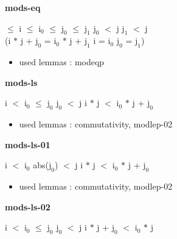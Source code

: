 \documentclass[a4paper]{article}
\begin{document}
\medskip

\bigskip

{\large\bf mods-eq}

\medskip

\Fol {} $\le$ i  $\le$ $\mbox{i}_{0}$  $\le$ $\mbox{j}_{0}$  $\le$ $\mbox{j}_{1}$ \And $\mbox{j}_{0}$ $<$ j \And $\mbox{j}_{1}$ $<$ j \\
 \tabf \Imp (i $*$ j + $\mbox{j}_{0}$ = $\mbox{i}_{0}$ $*$ j + $\mbox{j}_{1}$ \Equiv i = $\mbox{i}_{0}$ \And $\mbox{j}_{0}$ = $\mbox{j}_{1}$)

\begin{itemize}


\item       used lemmas  : modeqp

\end{itemize}

\medskip

\bigskip

{\large\bf mods-ls}

\medskip

 \Fol i $<$ $\mbox{i}_{0}$  $\le$ $\mbox{j}_{0}$ \And $\mbox{j}_{0}$ $<$ j \Imp i $*$ j $<$ $\mbox{i}_{0}$ $*$ j + $\mbox{j}_{0}$

\begin{itemize}


\item       used lemmas  : commutativity, modlep-02

\end{itemize}

\medskip

\bigskip

{\large\bf mods-ls-01}

\medskip

 \Fol i $<$ $\mbox{i}_{0}$ \And abs($\mbox{j}_{0}$) $<$ j \Imp i $*$ j $<$ $\mbox{i}_{0}$ $*$ j + $\mbox{j}_{0}$

\begin{itemize}


\item       used lemmas  : commutativity, modlep-02

\end{itemize}

\medskip

\bigskip

{\large\bf mods-ls-02}

\medskip

 \Fol i $<$ $\mbox{i}_{0}$  $\le$ $\mbox{j}_{0}$ \And $\mbox{j}_{0}$ $<$ j \Imp i $*$ j + $\mbox{j}_{0}$ $<$ $\mbox{i}_{0}$ $*$ j
\end{document}

